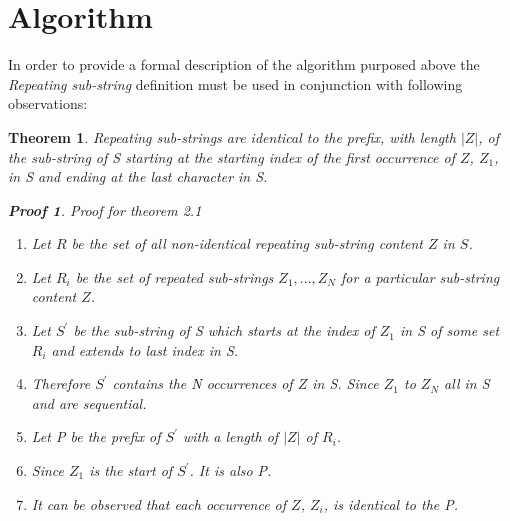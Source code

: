 \documentclass[12pt]{article}
\newtheorem{thm}{Theorem}[section]
\newtheorem{prf}{Proof}[section]
\begin{document}
\section{Algorithm}
\begin{flushleft} 
	In order to provide a formal description of the algorithm purposed above the \textit{Repeating sub-string} definition must be used in conjunction with following observations:
	\begin{thm} 
	Repeating sub-strings are identical to the prefix, with length $|Z|$, of the sub-string of S starting at the starting index of the first occurrence of $Z$, $Z_{1}$, in S and ending at the last character in S. 
		\begin{prf} Proof for theorem 2.1\\		
			\begin{enumerate}		
				\item Let $R$ be the set of all non-identical repeating sub-string content $Z$ in $S$.
				\item Let $R_{i}$ be the set of repeated sub-strings ${Z_{1},...,Z_{N}}$ for a particular sub-string content $Z$.
				\item Let $S^{\prime}$ be the sub-string of S which starts at the index of $Z_{1}$ in S of some set $R_{i}$ and extends to last index in S.
				\item Therefore $S^{\prime}$ contains the N occurrences of $Z$ in S. Since $Z_{1}$ to $Z_{N}$ all in S and are sequential.
				\item Let P be the prefix of $S^{\prime}$ with a length of $|Z|$ of $R_{i}$.		
				\item Since $Z_{1}$ is the start of $S^{\prime}$. It is also P.
				\item It can be observed that each occurrence of $Z$, $Z_{i}$, is identical to the P.
			\end{enumerate}
		\end{prf}
	\end{thm}
	

\end{flushleft}
\end{document}

